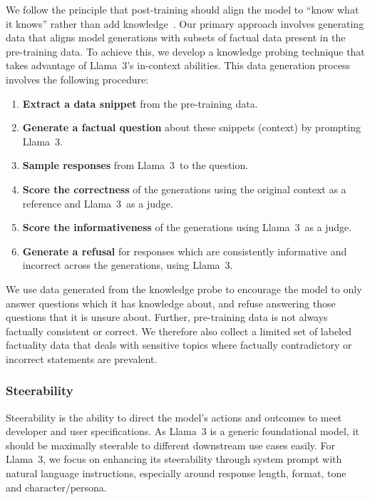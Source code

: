 We follow the principle that post-training should align the model to ``know what it knows'' rather than add knowledge~\citep{gekhman2024does,mielke2020metacognition}. Our primary approach involves generating data that aligns model generations with subsets of factual data present in the pre-training data. To achieve this, we develop a knowledge probing technique that takes advantage of Llama~3's in-context abilities. This data generation process involves the following procedure:

\begin{enumerate}
    \item \textbf{Extract a data snippet} from the pre-training data. 
    \item \textbf{Generate a factual question} about these snippets (context) by prompting Llama~3.
    \item \textbf{Sample responses} from Llama~3~to the question.
    \item \textbf{Score the correctness} of the generations using the original context as a reference and Llama~3~as a judge.
    \item \textbf{Score the informativeness} of the generations using Llama~3~as a judge.
    \item \textbf{Generate a refusal} for responses which are consistently informative and incorrect across the generations, using Llama~3.
\end{enumerate}

We use data generated from the knowledge probe to encourage the model to only answer questions which it has knowledge about, and refuse answering those questions that it is unsure about. Further, pre-training data is not always factually consistent or correct. We therefore also collect a limited set of labeled factuality data that deals with sensitive topics where factually contradictory or incorrect statements are prevalent. 

\subsubsection{Steerability}
\label{subsubsec:steerability}

Steerability is the ability to direct the model's actions and outcomes to meet developer and user specifications. As Llama~3 is a generic foundational model, it should be maximally steerable to different downstream use cases easily. For Llama~3, we focus on enhancing its steerability through system prompt with natural language instructions, especially around response length, format, tone and character/persona. 

